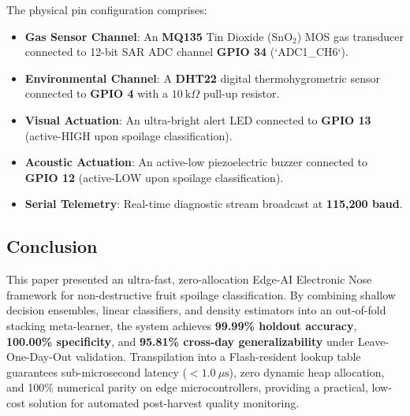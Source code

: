 \documentclass[conference]{IEEEtran}
\begin{document}
The physical pin configuration comprises:
\begin{itemize}
    \item \textbf{Gas Sensor Channel}: An \textbf{MQ135} Tin Dioxide ($\text{SnO}_2$) MOS gas transducer connected to 12-bit SAR ADC channel \textbf{GPIO 34} (`ADC1\_CH6`).
    \item \textbf{Environmental Channel}: A \textbf{DHT22} digital thermohygrometric sensor connected to \textbf{GPIO 4} with a $10\ \text{k}\Omega$ pull-up resistor.
    \item \textbf{Visual Actuation}: An ultra-bright alert LED connected to \textbf{GPIO 13} (active-HIGH upon spoilage classification).
    \item \textbf{Acoustic Actuation}: An active-low piezoelectric buzzer connected to \textbf{GPIO 12} (active-LOW upon spoilage classification).
    \item \textbf{Serial Telemetry}: Real-time diagnostic stream broadcast at \textbf{115,200 baud}.
\end{itemize}

\subsection{Conclusion}
This paper presented an ultra-fast, zero-allocation Edge-AI Electronic Nose framework for non-destructive fruit spoilage classification. By combining shallow decision ensembles, linear classifiers, and density estimators into an out-of-fold stacking meta-learner, the system achieves \textbf{99.99\% holdout accuracy}, \textbf{100.00\% specificity}, and \textbf{95.81\% cross-day generalizability} under Leave-One-Day-Out validation. Transpilation into a Flash-resident lookup table guarantees sub-microsecond latency ($< 1.0\ \mu\text{s}$), zero dynamic heap allocation, and 100\% numerical parity on edge microcontrollers, providing a practical, low-cost solution for automated post-harvest quality monitoring.
\end{document}
